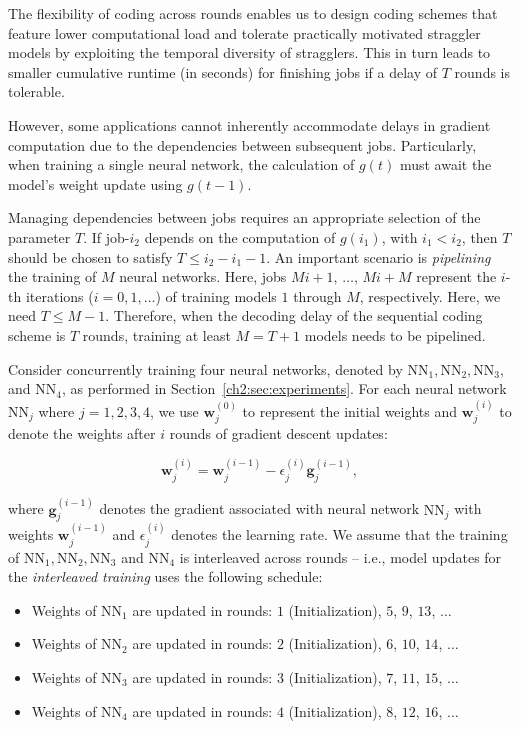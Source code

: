 The flexibility of coding across rounds enables us to design coding schemes that feature lower computational load and tolerate practically motivated straggler models by exploiting the temporal diversity of stragglers. This in turn leads to smaller cumulative runtime (in seconds) for finishing jobs if a delay of $T$ rounds is tolerable.

However, some applications cannot inherently accommodate delays in gradient computation due to the dependencies between subsequent jobs. Particularly, when training a single neural network, the calculation of $g(t)$ must await the model's weight update using $g(t-1)$.

Managing dependencies between jobs requires an appropriate selection of the parameter $T$. If job-$i_2$ depends on the computation of $g(i_1)$, with $i_1<i_2$, then $T$ should be chosen to satisfy $T\leq i_2-i_1-1$. An important scenario is \textit{pipelining} the training of $M$ neural networks. Here, jobs $Mi+1,\,\ldots,\,Mi+M$ represent the $i$-th iterations ($i=0,1,\ldots$) of training models $1$ through $M$, respectively. Here, we need $T\leq M-1$. Therefore, when the decoding delay of the sequential coding scheme is $T$ rounds, training at least $M = T+1$ models needs to be pipelined.

Consider concurrently training four neural networks, denoted by $\mathrm{NN}_1, \mathrm{NN}_2, \mathrm{NN}_3,$ and $\mathrm{NN}_4$, as performed in Section~\ref{ch2:sec:experiments}. For each neural network $\mathrm{NN}_j$ where $j=1,2,3,4$, we use ${\mathbf w}_j^{(0)}$ to represent the initial weights and ${\mathbf w}_j^{(i)}$ to denote the weights after $i$ rounds of gradient descent updates:

\begin{equation}
    {\mathbf w}_j^{(i)} = {\mathbf w}_j^{(i-1)} - \epsilon_j^{(i)} {\mathbf g}_j^{(i-1)},
    \label{ch2:eq:app_sgd}
\end{equation}

where ${\mathbf g}_j^{(i-1)}$ denotes the gradient associated with neural network $\mathrm{NN}_j$ with weights ${\mathbf w}_j^{(i-1)}$ and $\epsilon_j^{(i)}$ denotes the learning rate. We assume that the training of $\mathrm{NN}_1, \mathrm{NN}_2, \mathrm{NN}_3$ and $\mathrm{NN}_4$ is interleaved across rounds -- i.e., model updates for the {\em interleaved training} uses the following schedule:

\begin{itemize}
    \item Weights of $\mathrm{NN}_1$ are updated in  rounds: $1$ (Initialization), $5$, $9$, $13$, $\ldots$
    \item Weights of $\mathrm{NN}_2$ are updated in  rounds: $2$ (Initialization), $6$, $10$, $14$, $\ldots$
    \item Weights of $\mathrm{NN}_3$ are updated in  rounds: $3$ (Initialization), $7$, $11$, $15$, $\ldots$
    \item Weights of $\mathrm{NN}_4$ are updated in  rounds: $4$ (Initialization), $8$, $12$, $16$, $\ldots$
\end{itemize}

